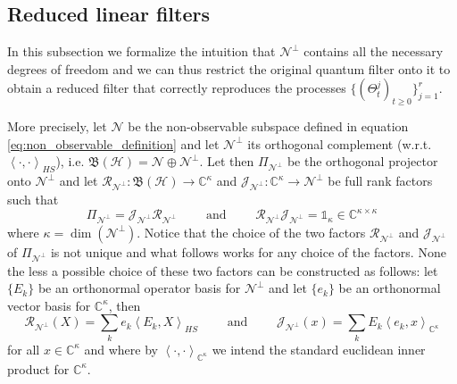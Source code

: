 \documentclass[aihp,12pt]{imsart}
\newcommand{\Hc}{\mathcal{H}}
\newcommand{\Jc}{\mathcal{J}}
\newcommand{\Rc}{\mathcal{R}}
\newcommand{\Ns}{\mathscr{N}}
\newcommand{\Cb}{\mathbb{C}}
\newcommand{\Bf}{\mathfrak{B}}
\newcommand{\one}{\mathbb{1}}
\newcommand{\inner}[2]{\left< #1,#2 \right>}
\theoremstyle{theorem}
\theoremstyle{definition}
\theoremstyle{remark}
\begin{document}
\subsection{Reduced linear filters}

In this subsection we formalize the intuition that $\Ns^\perp$ contains all the necessary degrees of freedom and we can thus restrict the original quantum filter onto it to obtain a reduced filter that correctly reproduces the processes $\{(\Theta_t^j)_{t\geq0}\}_{j=1}^r$. 

More precisely, let $\Ns$ be the non-observable subspace defined in equation \eqref{eq:non_observable_definition} and let $\Ns^\perp$ its orthogonal complement (w.r.t. $\inner{\cdot}{\cdot}_{HS}$), i.e. $\Bf(\Hc)=\Ns\oplus\Ns^\perp$. 
Let then $\Pi_{\Ns^\perp}$ be the orthogonal projector onto $\Ns^\perp$ and let $\Rc_{\Ns^\perp}:\Bf(\Hc)\to\Cb^\kappa$ and $\Jc_{\Ns^\perp}:\Cb^\kappa\to\Ns^\perp$ be full rank factors such that \[\Pi_{\Ns^\perp}=\Jc_{\Ns^\perp}\Rc_{\Ns^\perp}\qquad\text{ and }\qquad\Rc_{\Ns^\perp}\Jc_{\Ns^\perp} = \one_\kappa\in\Cb^{\kappa \times \kappa}\] where $\kappa=\dim(\Ns^\perp)$. 
Notice that the choice of the two factors $\Rc_{\Ns^\perp}$ and $\Jc_{\Ns^\perp}$ of $\Pi_{\Ns^\perp}$ is not unique and what follows works for any choice of the factors. None the less a possible choice of these two factors can be constructed as follows: let $\{E_k\}$ be an orthonormal operator basis for $\Ns^\perp$ and let $\{e_k\}$ be an orthonormal vector basis for $\Cb^\kappa$, then \[\Rc_{\Ns^\perp}(X) = \sum_{k} e_k \inner{E_k}{X}_{HS}\qquad\text{ and }\qquad\Jc_{\Ns^\perp}(x) = \sum_k E_k \inner{e_k}{x}_{\Cb^\kappa}\] for all $x\in\Cb^\kappa$ and where by $\inner{\cdot}{\cdot}_{\Cb^\kappa}$ we intend the standard euclidean inner product for $\Cb^\kappa$.
\end{document}
